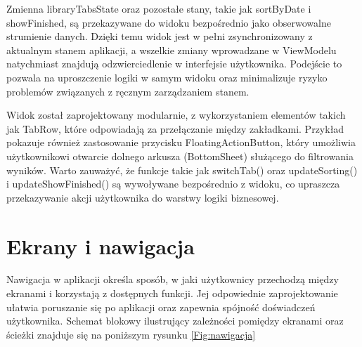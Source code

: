 \documentclass[12pt,twoside]{article}
\begin{document}
Zmienna libraryTabsState oraz pozostałe stany, takie jak sortByDate i showFinished, są przekazywane do widoku 
bezpośrednio jako obserwowalne strumienie danych. Dzięki temu widok jest w pełni zsynchronizowany z aktualnym 
stanem aplikacji, a wszelkie zmiany wprowadzane w ViewModelu natychmiast znajdują odzwierciedlenie w interfejsie 
użytkownika. Podejście to pozwala na uproszczenie logiki w samym widoku oraz minimalizuje ryzyko problemów 
związanych z ręcznym zarządzaniem stanem.

Widok został zaprojektowany modularnie, z wykorzystaniem elementów takich jak TabRow, które odpowiadają za 
przełączanie między zakładkami. Przykład pokazuje również zastosowanie przycisku FloatingActionButton, który 
umożliwia użytkownikowi otwarcie dolnego arkusza (BottomSheet) służącego do filtrowania wyników. Warto zauważyć, 
że funkcje takie jak switchTab() oraz updateSorting() i updateShowFinished() są wywoływane bezpośrednio z widoku, 
co upraszcza przekazywanie akcji użytkownika do warstwy logiki biznesowej.

\clearpage

\section{Ekrany i nawigacja}
Nawigacja w aplikacji określa sposób, w jaki użytkownicy przechodzą między ekranami i korzystają z dostępnych 
funkcji. Jej odpowiednie zaprojektowanie ułatwia poruszanie się po aplikacji oraz zapewnia spójność doświadczeń 
użytkownika. Schemat blokowy ilustrujący zależności pomiędzy ekranami oraz ścieżki znajduje się na poniższym
rysunku \ref{Fig:nawigacja}
\end{document}
